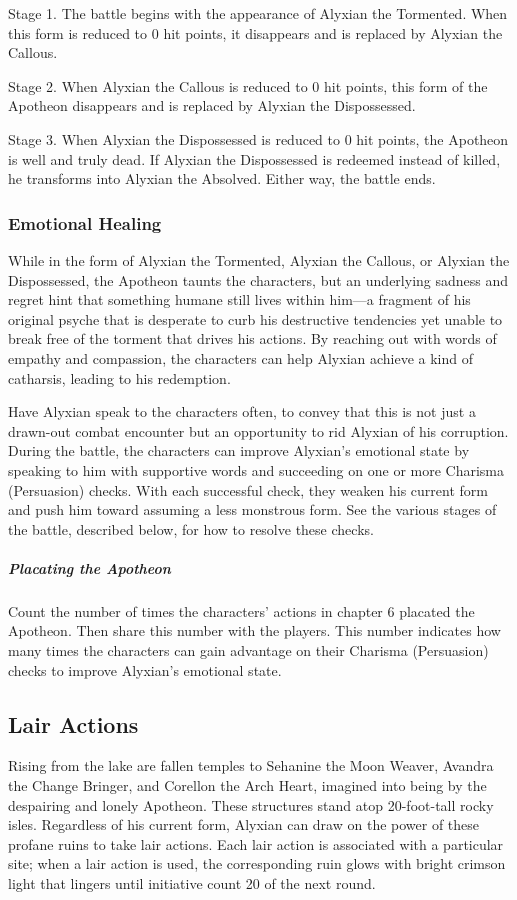 \documentclass[10pt,a4paper,twoside,fancy,bg=print,twocolumn,openany,nodeprecatedcode]{dndbook}
\begin{document}
Stage 1. The battle begins with the appearance of Alyxian the Tormented. When this form is reduced to 0 hit points, it disappears and is replaced by Alyxian the Callous.

Stage 2. When Alyxian the Callous is reduced to 0 hit points, this form of the Apotheon disappears and is replaced by Alyxian the Dispossessed.

Stage 3. When Alyxian the Dispossessed is reduced to 0 hit points, the Apotheon is well and truly dead. If Alyxian the Dispossessed is redeemed instead of killed, he transforms into Alyxian the Absolved. Either way, the battle ends.

\subsubsection{Emotional Healing}
While in the form of Alyxian the Tormented, Alyxian the Callous, or Alyxian the Dispossessed, the Apotheon taunts the characters, but an underlying sadness and regret hint that something humane still lives within him—a fragment of his original psyche that is desperate to curb his destructive tendencies yet unable to break free of the torment that drives his actions. By reaching out with words of empathy and compassion, the characters can help Alyxian achieve a kind of catharsis, leading to his redemption.

Have Alyxian speak to the characters often, to convey that this is not just a drawn-out combat encounter but an opportunity to rid Alyxian of his corruption. During the battle, the characters can improve Alyxian's emotional state by speaking to him with supportive words and succeeding on one or more Charisma (Persuasion) checks. With each successful check, they weaken his current form and push him toward assuming a less monstrous form. See the various stages of the battle, described below, for how to resolve these checks.

\subparagraph{Placating the Apotheon}
Count the number of times the characters' actions in chapter 6 placated the Apotheon. Then share this number with the players. This number indicates how many times the characters can gain advantage on their Charisma (Persuasion) checks to improve Alyxian's emotional state.

\subsection{Lair Actions}
Rising from the lake are fallen temples to Sehanine the Moon Weaver, Avandra the Change Bringer, and Corellon the Arch Heart, imagined into being by the despairing and lonely Apotheon. These structures stand atop 20-foot-tall rocky isles. Regardless of his current form, Alyxian can draw on the power of these profane ruins to take lair actions. Each lair action is associated with a particular site; when a lair action is used, the corresponding ruin glows with bright crimson light that lingers until initiative count 20 of the next round.
\end{document}

